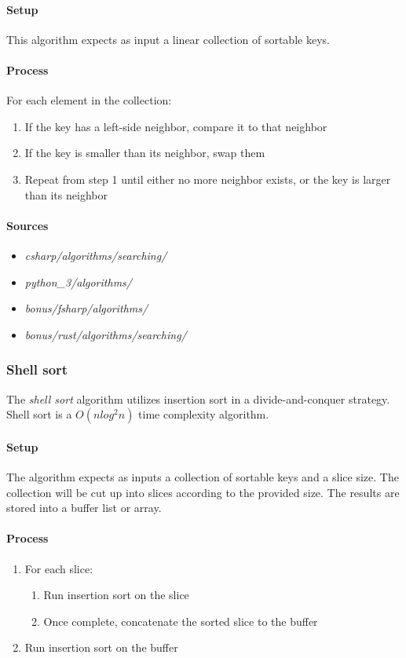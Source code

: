 \documentclass{article}
\begin{document}
{\paragraph{Setup}
This algorithm expects as input a linear collection of sortable keys.

\paragraph{Process}
For each element in the collection:
\begin{enumerate}
\item{If the key has a left-side neighbor, compare it to that neighbor}
\item{If the key is smaller than its neighbor, swap them}
\item{Repeat from step 1 until either no more neighbor exists, or the key is larger than its neighbor}
\end{enumerate}

\begin{samepage}
  \paragraph{Sources}
  \begin{itemize}
  \item{{\em csharp/algorithms/searching/}}
  \item{{\em python\_3/algorithms/}}
  \item{{\em bonus/fsharp/algorithms/}}
  \item{{\em bonus/rust/algorithms/searching/}}
  \end{itemize}
\end{samepage}

\subsubsection{Shell sort}
The {\em shell sort} algorithm utilizes insertion sort in a divide-and-conquer strategy.
Shell sort is a \(O(n log^2 n)\) time complexity algorithm.

\paragraph{Setup}
The algorithm expects as inputs a collection of sortable keys and a slice size. The collection will be cut up into
slices according to the provided size. The results are stored into a buffer list or array.

\paragraph{Process}
\begin{enumerate}
\item{For each slice:}
  \begin{enumerate}
  \item{Run insertion sort on the slice}
  \item{Once complete, concatenate the sorted slice to the buffer}
  \end{enumerate}
\item{Run insertion sort on the buffer}
\end{enumerate}

}
\end{document}
